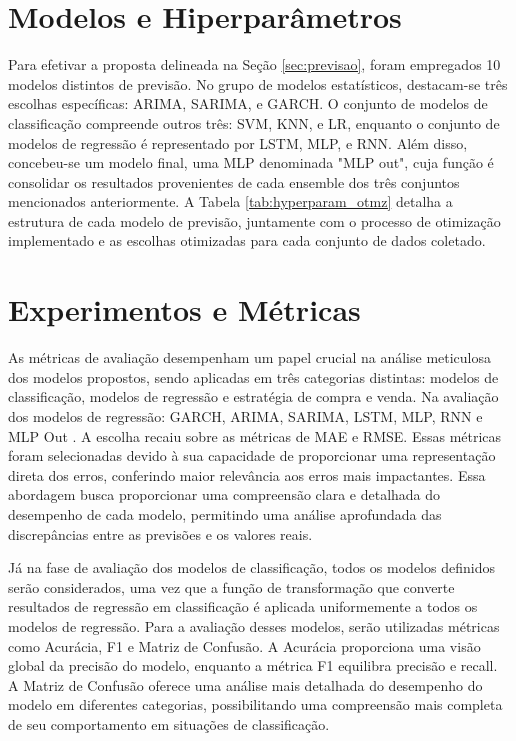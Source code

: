 \section{Modelos e Hiperparâmetros}
\label{sec:modelos_parametros_resultados}
Para efetivar a proposta delineada na Seção \ref{sec:previsao}, foram empregados 10 modelos distintos de previsão. No grupo de modelos estatísticos, destacam-se três escolhas específicas: \ac{ARIMA}, \ac{SARIMA}, e \ac{GARCH}. O conjunto de modelos de classificação compreende outros três: \ac{SVM}, \ac{KNN}, e \ac{LR}, enquanto o conjunto de modelos de regressão é representado por \ac{LSTM}, \ac{MLP}, e \ac{RNN}. Além disso, concebeu-se um modelo final, uma \ac{MLP} denominada "MLP out", cuja função é consolidar os resultados provenientes de cada ensemble dos três conjuntos mencionados anteriormente.
A Tabela \ref{tab:hyperparam_otmz} detalha a estrutura de cada modelo de previsão, juntamente com o processo de otimização implementado e as escolhas otimizadas para cada conjunto de dados coletado. 

	
\section{Experimentos e Métricas}
\label{sec:experimentos _metricas}
As métricas de avaliação desempenham um papel crucial na análise meticulosa dos modelos propostos, sendo aplicadas em três categorias distintas: modelos de classificação, modelos de regressão e estratégia de compra e venda.
Na avaliação dos modelos de regressão:  \ac{GARCH}, \ac{ARIMA}, \ac{SARIMA}, \ac{LSTM}, \ac{MLP}, \ac{RNN} e \ac{MLP} Out . A escolha recaiu sobre as métricas de \ac{MAE} e \ac{RMSE}. Essas métricas foram selecionadas devido à sua capacidade de proporcionar uma representação direta dos erros, conferindo maior relevância aos erros mais impactantes. Essa abordagem busca proporcionar uma compreensão clara e detalhada do desempenho de cada modelo, permitindo uma análise aprofundada das discrepâncias entre as previsões e os valores reais.

Já na fase de avaliação dos modelos de classificação, todos os modelos definidos serão considerados, uma vez que a função de transformação que converte resultados de regressão em classificação é aplicada uniformemente a todos os modelos de regressão. Para a avaliação desses modelos, serão utilizadas métricas como Acurácia, \ac{F1} e Matriz de Confusão. A Acurácia proporciona uma visão global da precisão do modelo, enquanto a métrica \ac{F1} equilibra precisão e recall. A Matriz de Confusão oferece uma análise mais detalhada do desempenho do modelo em diferentes categorias, possibilitando uma compreensão mais completa de seu comportamento em situações de classificação. 

